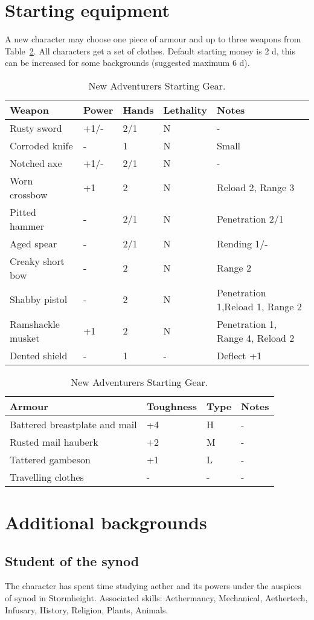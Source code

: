 \documentclass[a4paper,11pt,oneside]{book}
\begin{document}
\section{Starting equipment}
A new character may choose one piece of armour and up to three weapons from Table~\ref{tab:start-gear}. All characters get a set of clothes. Default starting money is 2 d, this can be increased for some backgrounds (suggested maximum 6 d).
\begin{table}[ht!]
	\centering
	\caption{New Adventurers Starting Gear.}
	\label{tab:start-gear}
	\begin{tabular}{|l|l|l|l|l|}
		\hline
		Weapon & Power & Hands &  Lethality & Notes\\
		\hline
		Rusty sword & +1/- & 2/1 & N & -\\
		Corroded knife & - & 1 & N & Small\\
		Notched axe & +1/- & 2/1 & N & -\\
		Worn crossbow & +1 & 2 & N & Reload 2, Range 3\\
		Pitted hammer & - & 2/1 & N & Penetration 2/1 \\
		Aged spear & - & 2/1 & N & Rending 1/-\\
		Creaky short bow & - & 2 & N & Range 2\\
		Shabby pistol & - & 2 & N & Penetration 1,Reload 1, Range 2 \\
		Ramshackle musket & +1 & 2 & N & Penetration 1, Range 4, Reload 2 \\
		Dented shield & - & 1 & - & Deflect +1 \\
		\hline
	\end{tabular}
	\begin{tabular}{|l|l|l|l|}	
		\hline
		Armour & Toughness & Type & Notes\\
		\hline
		Battered breastplate and mail & +4 & H & - \\
		Rusted mail hauberk & +2 & M & - \\
		Tattered gambeson & +1 & L & - \\
		Travelling clothes & - & - & - \\
		\hline
	\end{tabular}
\end{table}


\section{Additional backgrounds}

\subsection{Student of the synod}
The character has spent time studying aether and its powers under the auspices of synod in Stormheight. Associated skills: Aethermancy, Mechanical, Aethertech, Infusary, History, Religion, Plants, Animals.
\end{document}
